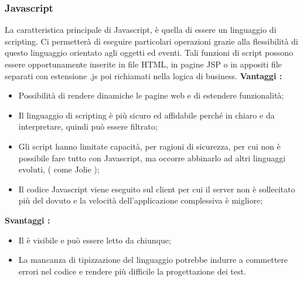 {{		\subsubsection{Javascript}{
			La caratteristica principale di Javascript, è quella di essere un linguaggio di scripting. Ci permetterà di eseguire particolari operazioni grazie alla flessibilità di questo linguaggio orientato agli oggetti ed eventi. Tali funzioni di script possono essere opportunamente inserite in file HTML, in pagine JSP o in appositi file separati con estensione .js poi richiamati nella logica di business.
			\textbf{Vantaggi :}
			\begin{itemize}\itemsep1pt
				\item Possibilità di rendere dinamiche le pagine web e di estendere funzionalità;
				\item Il linguaggio di scripting è più sicuro ed affidabile perché in chiaro e da interpretare, quindi può essere filtrato;
				\item Gli script hanno limitate capacità, per ragioni di sicurezza, per cui non è possibile fare tutto con Javascript, ma occorre abbinarlo ad altri linguaggi evoluti, ( come Jolie );
				\item Il codice Javascript viene eseguito sul client per cui il server non è sollecitato più del dovuto e la velocità dell'applicazione complessiva è migliore;
			\end{itemize}
			\textbf{Svantaggi :}
			\begin{itemize}\itemsep1pt
				\item Il è visibile e può essere letto da chiunque;
				\item La mancanza di tipizzazione del linguaggio potrebbe indurre a commettere errori nel codice e rendere più difficile la progettazione dei test.
			\end{itemize}
		}
}}
